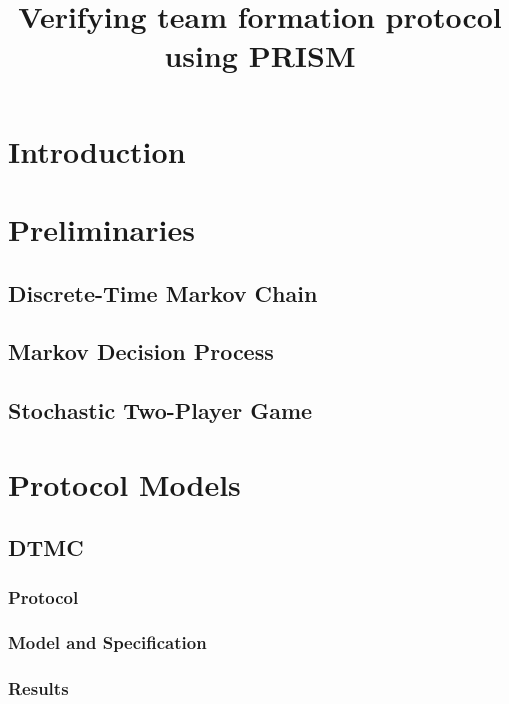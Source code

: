 \documentclass{llncs}
\begin{document}
\title{Verifying team formation protocol using PRISM}
\author{}
\email{}

\maketitle

\begin{abstract}
 
\end{abstract}

\section{Introduction}

\section{Preliminaries}

\subsection{Discrete-Time Markov Chain}
\subsection{Markov Decision Process}
\subsection{Stochastic Two-Player Game}

\section{Protocol Models}

\subsection{DTMC}
\subsubsection{Protocol}
\subsubsection{Model and Specification}
\subsubsection{Results}
\end{document}
